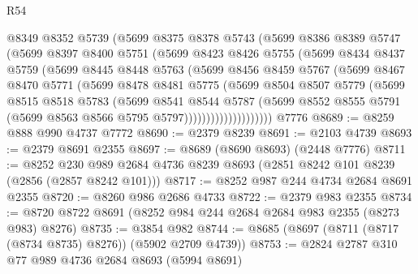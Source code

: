 \begin{lexlean}{R54}
\begin{coremodule}
                @8349
                @8352
                @5739
                (@5699
                  @8375
                  @8378
                  @5743
                  (@5699
                    @8386
                    @8389
                    @5747
                    (@5699
                      @8397
                      @8400
                      @5751
                      (@5699
                        @8423
                        @8426
                        @5755
                        (@5699
                          @8434
                          @8437
                          @5759
                          (@5699
                            @8445
                            @8448
                            @5763
                            (@5699
                              @8456
                              @8459
                              @5767
                              (@5699
                                @8467
                                @8470
                                @5771
                                (@5699
                                  @8478
                                  @8481
                                  @5775
                                  (@5699
                                    @8504
                                    @8507
                                    @5779
                                    (@5699
                                      @8515
                                      @8518
                                      @5783
                                      (@5699
                                        @8541
                                        @8544
                                        @5787
                                        (@5699
                                          @8552
                                          @8555
                                          @5791
                                          (@5699 @8563 @8566 @5795 @5797))))))))))))))))))))
    @7776
@8689 := @8259 @888 @990 @4737 @7772
@8690 := @2379 @8239
@8691 := @2103 @4739
@8693 := @2379 @8691 @2355
@8697 := @8689 (@8690 @8693) (@2448 @7776)
@8711 := @8252 @230 @989 @2684 @4736 @8239 @8693 (@2851 @8242 @101 @8239 (@2856 (@2857 @8242 @101)))
@8717 := @8252 @987 @244 @4734 @2684 @8691 @2355
@8720 := @8260 @986 @2686 @4733
@8722 := @2379 @983 @2355
@8734 := @8720 @8722 @8691 (@8252 @984 @244 @2684 @2684 @983 @2355 (@8273 @983) @8276)
@8735 := @3854 @982
@8744 := @8685 (@8697 (@8711 (@8717 (@8734 @8735) @8276)) (@5902 @2709 @4739))
@8753 := @2824 @2787 @310 @77 @989 @4736 @2684 @8693 (@5994 @8691)

\end{coremodule}
\end{lexlean}
